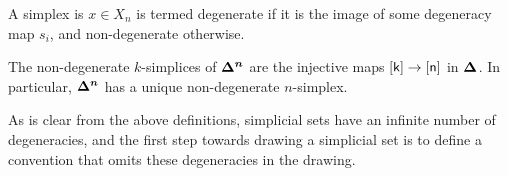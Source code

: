 \documentclass[10pt]{art}
\begin{document}
\begin{definition}
  A simplex is $x \in X_n$ is termed degenerate if it is the image of some degeneracy map $s_i$, and non-degenerate otherwise.
\end{definition}

\begin{example}
  The non-degenerate $k$-simplices of $\boldsymbol{\Delta^{n}}$ are the injective maps $\mathsf{[k]} \rightarrow \mathsf{[n]}$ in $\boldsymbol{\Delta^{}}$. In particular, $\boldsymbol{\Delta^{n}}$ has a unique non-degenerate $n$-simplex.
\end{example}

As is clear from the above definitions, simplicial sets have an infinite number of degeneracies, and the first step towards drawing a simplicial set is to define a convention that omits these degeneracies in the drawing.
\end{document}
